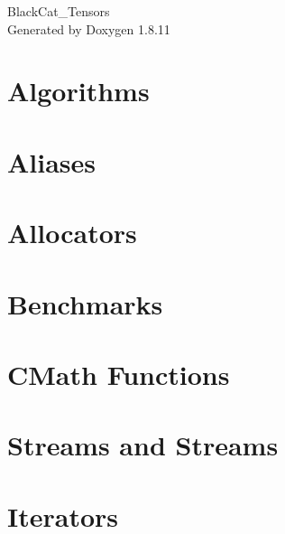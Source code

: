 \documentclass[twoside]{book}
\newcommand{\+}{\discretionary{\mbox{\scriptsize$\hookleftarrow$}}{}{}}
\newcommand{\clearemptydoublepage}{%
  \newpage{\pagestyle{empty}\cleardoublepage}%
}
\begin{document}
\hypersetup{pageanchor=false,
             bookmarksnumbered=true,
             pdfencoding=unicode
            }
\begin{titlepage}
\vspace*{7cm}
\begin{center}%
{\Large Black\+Cat\+\_\+\+Tensors }\\
\vspace*{1cm}
{\large Generated by Doxygen 1.8.11}\\
\end{center}
\end{titlepage}
\clearemptydoublepage
\tableofcontents
\clearemptydoublepage
{}
\hypersetup{pageanchor=true}

\chapter{Algorithms}
\label{md_docs_algorithms}
\hypertarget{md_docs_algorithms}{}

\chapter{Aliases}
\label{md_docs_aliases}
\hypertarget{md_docs_aliases}{}

\chapter{Allocators}
\label{md_docs_allocators}
\hypertarget{md_docs_allocators}{}

\chapter{Benchmarks}
\label{md_docs_benchmarks}
\hypertarget{md_docs_benchmarks}{}

\chapter{C\+Math Functions}
\label{md_docs_cmath_functions}
\hypertarget{md_docs_cmath_functions}{}

\chapter{Streams and Streams}
\label{md_docs_contexts_and_workspaces}
\hypertarget{md_docs_contexts_and_workspaces}{}

\chapter{Iterators}
\label{md_docs_iterators}
\hypertarget{md_docs_iterators}{}

\end{document}
